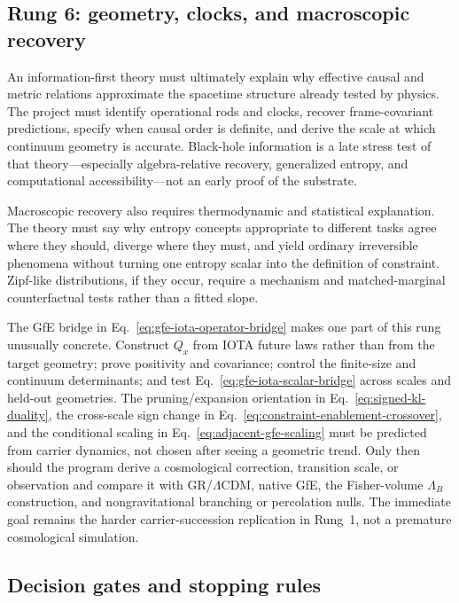 \subsection{Rung 6: geometry, clocks, and macroscopic recovery}

An information-first theory must ultimately explain why effective causal and
metric relations approximate the spacetime structure already tested by
physics. The project must identify operational rods and clocks, recover
frame-covariant predictions, specify when causal order is definite, and derive
the scale at which continuum geometry is accurate. Black-hole information is a
late stress test of that theory---especially algebra-relative recovery,
generalized entropy, and computational accessibility---not an early proof of
the substrate.

Macroscopic recovery also requires thermodynamic and statistical explanation.
The theory must say why entropy concepts appropriate to different tasks agree
where they should, diverge where they must, and yield ordinary irreversible
phenomena without turning one entropy scalar into the definition of
constraint. Zipf-like distributions, if they occur, require a mechanism and
matched-marginal counterfactual tests rather than a fitted slope.

The GfE bridge in Eq.~\eqref{eq:gfe-iota-operator-bridge} makes one part of this
rung unusually concrete. Construct $Q_x$ from IOTA future laws rather than from
the target geometry; prove positivity and covariance; control the finite-size
and continuum determinants; and test Eq.~\eqref{eq:gfe-iota-scalar-bridge}
across scales and held-out geometries. The pruning/expansion orientation in
Eq.~\eqref{eq:signed-kl-duality}, the cross-scale sign change in
Eq.~\eqref{eq:constraint-enablement-crossover}, and the conditional scaling in
Eq.~\eqref{eq:adjacent-gfe-scaling} must be predicted from carrier dynamics,
not chosen after seeing a geometric trend. Only then should the program derive a
cosmological correction, transition scale, or observation and compare it with
GR/\(\Lambda\)CDM, native GfE, the Fisher-volume $\Lambda_B$ construction, and
nongravitational branching or percolation nulls. The immediate goal remains the
harder carrier-succession replication in
Rung~1, not a premature cosmological simulation.

\subsection{Decision gates and stopping rules}

